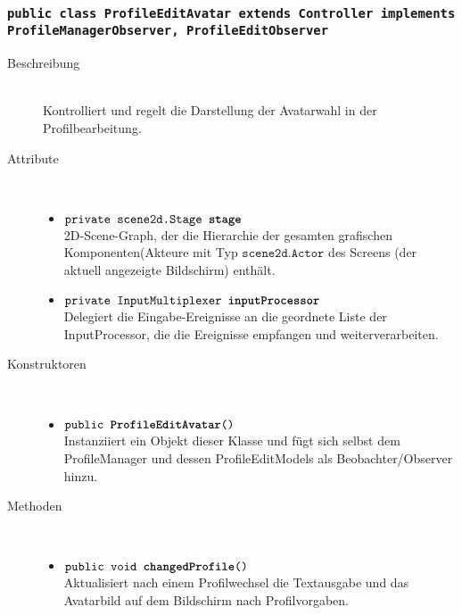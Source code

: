 \subsubsection{\normalfont \texttt{public class \textbf{ProfileEditAvatar} extends Controller implements ProfileManagerObserver, ProfileEditObserver}}

\begin{description}
\item[Beschreibung] \hfill \\ Kontrolliert und regelt die Darstellung der Avatarwahl in der Profilbearbeitung.
\item[Attribute] \hfill \\
	\vspace{-.8cm}
	\begin{itemize}
		\item $\texttt{private scene2d.Stage \textbf{stage}}$ \\ 2D-Scene-Graph, der die Hierarchie der gesamten grafischen Komponenten(Akteure mit Typ $\texttt{scene2d.Actor}$ des Screens (der aktuell angezeigte Bildschirm) enthält. 
		\item $\texttt{private InputMultiplexer \textbf{inputProcessor}}$ \\ Delegiert die Eingabe-Ereignisse an die geordnete Liste der InputProcessor, die die Ereignisse empfangen und weiterverarbeiten.
	\end{itemize}
	
\item[Konstruktoren] \hfill \\
	\vspace{-.8cm}
	\begin{itemize}
		\item $\texttt{public \textbf{ProfileEditAvatar}()}$ \\ Instanziiert ein Objekt dieser Klasse und fügt sich selbst dem ProfileManager und dessen ProfileEditModels als Beobachter/Observer hinzu.
	\end{itemize}
	
\item[Methoden] \hfill \\
	\vspace{-.8cm}
	\begin{itemize}		
		\item $\texttt{public void \textbf{changedProfile}()}$ \\ Aktualisiert nach einem Profilwechsel die Textausgabe und das Avatarbild auf dem Bildschirm nach Profilvorgaben.
		

\end{itemize}
\end{description}
